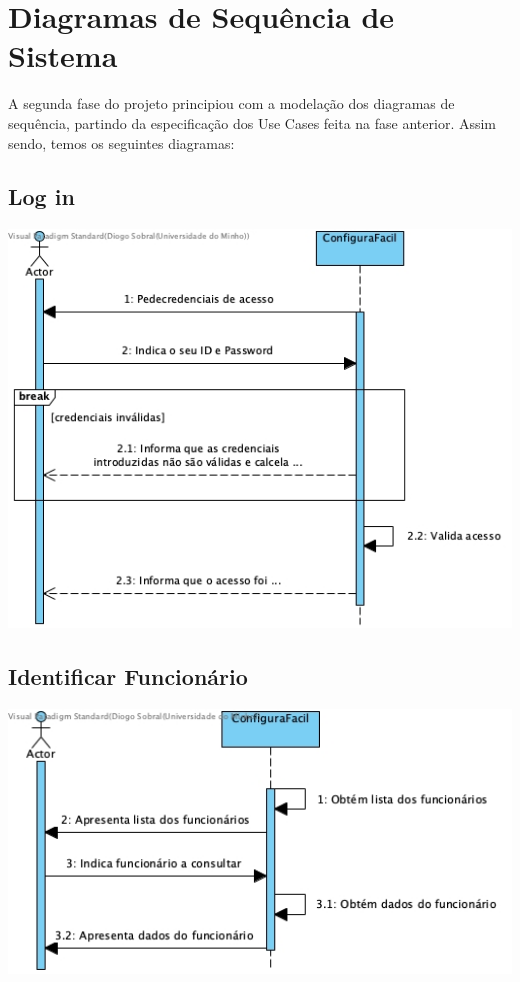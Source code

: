 \section{Diagramas de Sequência de Sistema}
A segunda fase do projeto principiou com a modelação dos diagramas de sequência, partindo da especificação dos Use Cases feita na fase anterior. Assim sendo, temos os seguintes diagramas:

\subsection{Log in}
\begin{center}
 	\includegraphics[width = 5.5in]{DSS/DSS-Log_In.jpg}
\end{center}

\subsection{Identificar Funcionário}
\begin{center}
 	\includegraphics[width = 5.5in]{DSS/DSS-Identificar_Funcionario.jpg}
\end{center}

